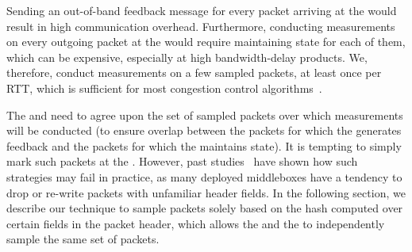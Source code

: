  Sending an out-of-band feedback message for every packet arriving at the \outbox would result in high communication overhead. Furthermore, conducting measurements on every outgoing packet at the \inbox would require maintaining state for each of them, which can be expensive, especially at high bandwidth-delay products. We, therefore, conduct measurements on a few sampled packets, at least once per RTT, which is sufficient for most congestion control algorithms~\cite{ccp}. 

 The \inbox and \outbox need to agree upon the set of sampled packets over which measurements will be conducted (to ensure overlap between the packets for which the \outbox generates feedback and the packets for which the \inbox maintains state). It is tempting to simply mark such packets at the \inbox. However, past studies~\cite{ipoptions, mboxbadness, quic} have shown how such strategies may fail in practice, as many deployed middleboxes have a tendency to drop or re-write packets with unfamiliar header fields. 
In the following section, we describe our technique to sample packets solely based on the hash computed over certain fields in the packet header, which allows the \inbox and the \outbox to independently sample the same set of packets.

